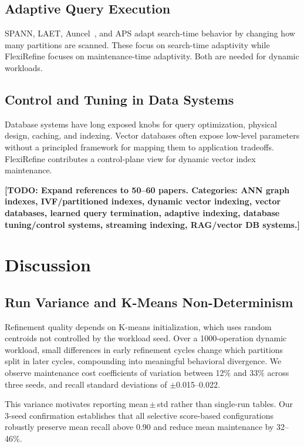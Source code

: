 \documentclass[sigconf, nonacm]{acmart}
\newcommand{\system}{FlexiRefine\xspace}
\newcommand{\todo}[1]{\textbf{[TODO: #1]}}
\begin{document}
\subsection{Adaptive Query Execution}
SPANN, LAET, Auncel~\cite{todo-auncel}, and APS adapt search-time
behavior by changing how many partitions are scanned. These focus on
search-time adaptivity while \system focuses on maintenance-time
adaptivity. Both are needed for dynamic workloads.

\subsection{Control and Tuning in Data Systems}
Database systems have long exposed knobs for query optimization,
physical design, caching, and indexing. Vector databases often expose
low-level parameters without a principled framework for mapping them to
application tradeoffs. \system contributes a control-plane view for
dynamic vector index maintenance.

\todo{Expand references to 50--60 papers. Categories: ANN graph indexes,
IVF/partitioned indexes, dynamic vector indexing, vector databases,
learned query termination, adaptive indexing, database tuning/control
systems, streaming indexing, RAG/vector DB systems.}

\section{Discussion}
\label{sec:discussion}

\subsection{Run Variance and K-Means Non-Determinism}

Refinement quality depends on K-means initialization, which uses
random centroids not controlled by the workload seed. Over a
1000-operation dynamic workload, small differences in early refinement
cycles change which partitions split in later cycles, compounding into
meaningful behavioral divergence. We observe maintenance cost
coefficients of variation between 12\% and 33\% across three seeds,
and recall standard deviations of $\pm$0.015--0.022.

This variance motivates reporting mean\,$\pm$\,std rather than
single-run tables. Our 3-seed confirmation establishes that all
selective score-based configurations robustly preserve mean recall
above 0.90 and reduce mean maintenance by 32--46\%.
\end{document}
